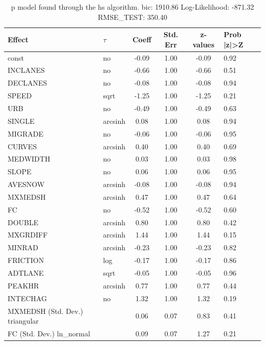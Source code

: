 \begin{table}
	\caption{p model found through the hs algorithm. bic: 1910.86 Log-Likelihood: -871.32 RMSE_TEST: 350.40}
	\begin{center}
		\begin{tabular}{|l|l|c|c|c|l|}
			\hline
			Effect & $\tau$ & Coeff & Std. Err & z-values & Prob |z|>Z \\
			\hline
			const & no & -0.09 & 1.00 & -0.09 & 0.92 \\
			\hline
			INCLANES & no & -0.66 & 1.00 & -0.66 & 0.51 \\
			\hline
			DECLANES & no & -0.08 & 1.00 & -0.08 & 0.94 \\
			\hline
			SPEED & sqrt & -1.25 & 1.00 & -1.25 & 0.21 \\
			\hline
			URB & no & -0.49 & 1.00 & -0.49 & 0.63 \\
			\hline
			SINGLE & arcsinh & 0.08 & 1.00 & 0.08 & 0.94 \\
			\hline
			MIGRADE & no & -0.06 & 1.00 & -0.06 & 0.95 \\
			\hline
			CURVES & arcsinh & 0.40 & 1.00 & 0.40 & 0.69 \\
			\hline
			MEDWIDTH & no & 0.03 & 1.00 & 0.03 & 0.98 \\
			\hline
			SLOPE & no & 0.06 & 1.00 & 0.06 & 0.95 \\
			\hline
			AVESNOW & arcsinh & -0.08 & 1.00 & -0.08 & 0.94 \\
			\hline
			MXMEDSH & arcsinh & 0.47 & 1.00 & 0.47 & 0.64 \\
			\hline
			FC & no & -0.52 & 1.00 & -0.52 & 0.60 \\
			\hline
			DOUBLE & arcsinh & 0.80 & 1.00 & 0.80 & 0.42 \\
			\hline
			MXGRDIFF & arcsinh & 1.44 & 1.00 & 1.44 & 0.15 \\
			\hline
			MINRAD & arcsinh & -0.23 & 1.00 & -0.23 & 0.82 \\
			\hline
			FRICTION & log & -0.17 & 1.00 & -0.17 & 0.86 \\
			\hline
			ADTLANE & sqrt & -0.05 & 1.00 & -0.05 & 0.96 \\
			\hline
			PEAKHR & arcsinh & 0.77 & 1.00 & 0.77 & 0.44 \\
			\hline
			INTECHAG & no & 1.32 & 1.00 & 1.32 & 0.19 \\
			\hline
			MXMEDSH (Std. Dev.) triangular &  & 0.06 & 0.07 & 0.83 & 0.41 \\
			\hline
			FC (Std. Dev.) ln_normal &  & 0.09 & 0.07 & 1.27 & 0.21 \\

\end{tabular}
\end{center}
\end{table}
